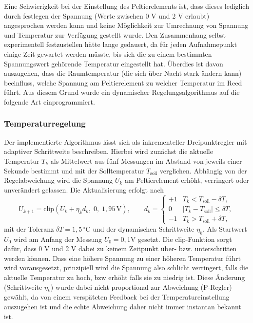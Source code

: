 \documentclass[11pt,a4paper]{article}
\begin{document}
Eine Schwierigkeit bei der Einstellung des Peltierelements ist, dass dieses lediglich durch festlegen der Spannung (Werte zwischen 0 V und 2 V erlaubt) angesprochen werden kann und keine Möglichkeit zur Umrechnung von Spannung und Temperatur zur Verfügung gestellt wurde. Den Zusammenhang selbst experimentell festzustellen hätte lange gedauert, da für jeden Aufnahmepunkt einige Zeit gewartet werden müsste, bis sich die zu einem bestimmten Spannungswert gehörende Temperatur eingestellt hat. Überdies ist davon auszugehen, dass die Raumtemperatur (die sich über Nacht stark ändern kann) beeinfluss, welche Spannung am Peltierelement zu welcher Temperatur im Reed führt. Aus diesem Grund wurde ein dynamischer Regelungsalgorithmus auf die folgende Art einprogrammiert.


\subsubsection{Temperaturregelung}
 Der implementierte Algorithmus lässt sich als inkrementeller Dreipunktregler mit adaptiver Schrittweite beschreiben. Hierbei wird zunächst die aktuelle Temperatur $T_k$ als Mittelwert aus fünf Messungen im Abstand von jeweils einer Sekunde bestimmt und mit der Solltemperatur $T_\mathrm{soll}$ verglichen. Abhängig von der Regelabweichung wird die Spannung $U_k$ am Peltierelement erhöht, verringert oder unverändert gelassen. Die Aktualisierung erfolgt nach
\begin{equation} \label{eq:U-update}
    U_{k+1} = \mathrm{clip}(U_k + \eta_k d_k,\;0,\;1{,}95\,\mathrm{V}),
    \qquad
    d_k =
    \begin{cases}
        +1 & T_k < T_\mathrm{soll}-\delta T,\\
        0 & |T_k-T_\mathrm{soll}|\leq\delta T,\\
        -1 & T_k > T_\mathrm{soll}+\delta T,
    \end{cases}
\end{equation}
mit der Toleranz $\delta T=1{,}5\,^\circ\mathrm{C}$ und der dynamischen Schrittweite $\eta_k$. Als Startwert $U_0$ wird am Anfang der Messung $U_0=0{,}1$V gesetzt. Die clip-Funktion sorgt dafür, dass 0 V und 2 V dabei zu keinem Zeitpunkt über- bzw. unterschritten werden können. Dass eine höhere Spannung zu einer höheren Temperatur führt wird vorausgesetzt, prinzipiell wird die Spannung also schlicht verringert, falls die aktuelle Temperatur zu hoch, bzw erhöht falls sie zu niedrig ist. Diese Änderung (Schrittweite $\eta_k$) wurde dabei nicht proportional zur Abweichung (P-Regler) gewählt, da von einem verspäteten Feedback bei der Temperatureinstellung auszugehen ist und die echte Abweichung daher nicht immer instantan bekannt ist. 
\end{document}
